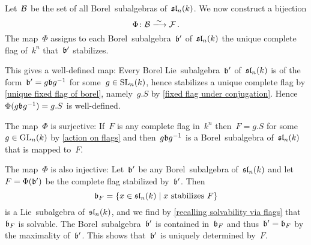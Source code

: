 Let~$\mathcal{B}$ be the set of all Borel~subalgebras of~$\mathfrak{sl}_n(k)$.
We now construct a bijection
\[
  \Phi
  \colon
  \Borels
  \xlongto{\sim}
  \Flags \,.
\]
The map~$\Phi$ assigns to each Borel~subalgebra~$\mathfrak{b}'$ of~$\mathfrak{sl}_n(k)$ the unique complete flag of~$k^n$ that~$\mathfrak{b}'$ stabilizes.

This gives a well-defined map:
Every Borel Lie~subalgebra~$\mathfrak{b}'$ of~$\mathfrak{sl}_n(k)$ is of the form~$\mathfrak{b}' = g \mathfrak{b} g^{-1}$ for some~$g \in \operatorname{SL}_n(k)$, hence stabilizes a unique complete flag by \cref{unique fixed flag of borel}, namely~$g.S$ by \cref{fixed flag under conjugation}.
Hence~$\Phi(g \mathfrak{b} g^{-1}) = g.S$ is well-defined.

The map~$\Phi$ is surjective:
If~$F$ is any complete flag in~$k^n$ then~$F = g.S$ for some~$g \in \operatorname{GL}_n(k)$ by \cref{action on flags} and then~$g \mathfrak{b} g^{-1}$ is a Borel~subalgebra of~$\mathfrak{sl}_n(k)$ that is mapped to~$F$.

The map~$\Phi$ is also injective:
Let~$\mathfrak{b}'$ be any Borel~subalgebra of~$\mathfrak{sl}_n(k)$ and let~$F = \Phi(\mathfrak{b}')$ be the complete flag stabilized by~$\mathfrak{b}'$.
Then
\[
  \blie_F
  =
  \{
    x \in \sllie_n(k)
  \suchthat
    \text{$x$ stabilizes~$F$}
  \}
\]
is a Lie~subalgebra of~$\mathfrak{sl}_n(k)$, and we find by \cref{recalling solvability via flags} that~$\mathfrak{b}_F$ is solvable.
The Borel~subalgebra~$\mathfrak{b}'$ is contained in~$\mathfrak{b}_F$ and thus~$\mathfrak{b}' = \mathfrak{b}_F$ by the maximality of~$\mathfrak{b}'$.
This shows that~$\mathfrak{b}'$ is uniquely determined by~$F$.

